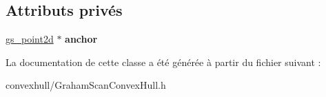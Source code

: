 \subsection*{Attributs privés}
\begin{DoxyCompactItemize}
\item 
\hypertarget{class_g_s_point2_d_compare_a6565ae0a6cb40a412f5e72558ed3271f}{\hyperlink{structgs__point2d}{gs\-\_\-point2d} $\ast$ {\bfseries anchor}}\label{class_g_s_point2_d_compare_a6565ae0a6cb40a412f5e72558ed3271f}

\end{DoxyCompactItemize}


La documentation de cette classe a été générée à partir du fichier suivant \-:\begin{DoxyCompactItemize}
\item 
convexhull/Graham\-Scan\-Convex\-Hull.\-h\end{DoxyCompactItemize}
